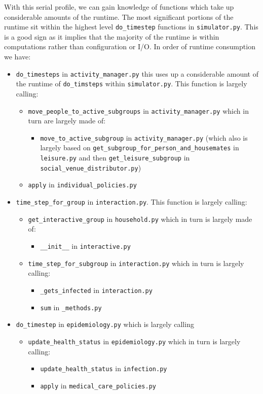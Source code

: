 With this serial profile, we can gain knowledge of functions which take up
considerable amounts of the runtime. The most significant portions of the
runtime sit within the highest level \verb|do_timestep| functions in \verb|simulator.py|.
This is a good sign as it implies that the majority of the runtime is within
computations rather than configuration or I/O. In order of runtime consumption
we have:
\begin{itemize}
    \item \verb|do_timesteps| in \verb|activity_manager.py| this uses up a considerable amount of
  the runtime of \verb|do_timsteps| within \verb|simulator.py|. This function is largely
calling:
    \begin{itemize}
        \item \verb|move_people_to_active_subgroups| in \verb|activity_manager.py| which in turn are
   largely made of:
        \begin{itemize}
            \item \verb|move_to_active_subgroup| in \verb|activity_manager.py| (which also is largely
    based on \verb|get_subgroup_for_person_and_housemates| in \verb|leisure.py| and then
\verb|get_leisure_subgroup| in \verb|social_venue_distributor.py|)
        \end{itemize}
        \item \verb|apply| in \verb|individual_policies.py|
    \end{itemize}
    \item \verb|time_step_for_group| in \verb|interaction.py|. This function is largely calling:
    \begin{itemize}
        \item \verb|get_interactive_group| in \verb|household.py| which in turn is largely made of:
        \begin{itemize}
            \item \verb|__init__| in \verb|interactive.py|
        \end{itemize}
        \item \verb|time_step_for_subgroup| in \verb|interaction.py| which in turn is largely calling:
        \begin{itemize}
            \item \verb|_gets_infected| in \verb|interaction.py|
            \item \verb|sum| in \verb|_methods.py|
        \end{itemize}
    \end{itemize}
    \item \verb|do_timestep| in \verb|epidemiology.py| which is largely calling
    \begin{itemize}
        \item \verb|update_health_status| in \verb|epidemiology.py| which in turn is largely calling:
        \begin{itemize}
            \item \verb|update_health_status| in \verb|infection.py|
            \item \verb|apply| in \verb|medical_care_policies.py|
        \end{itemize}
    \end{itemize}
\end{itemize}
